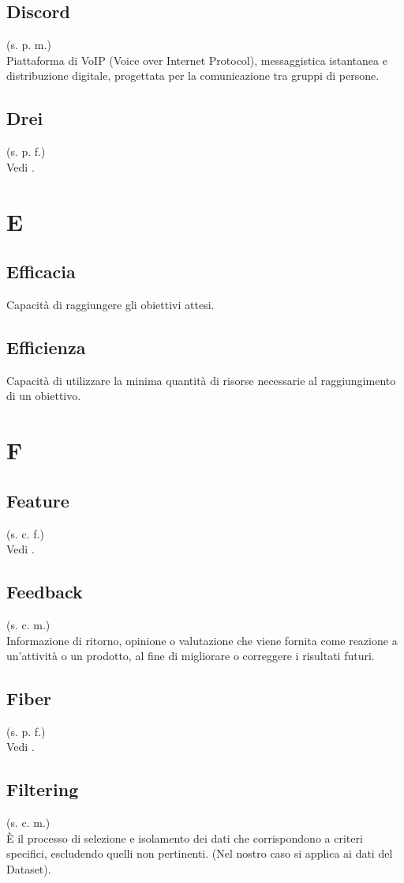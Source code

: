     \subsection{Discord}
    (s. p. m.)\\
    Piattaforma di VoIP (Voice over Internet Protocol), messaggistica istantanea 
    e distribuzione digitale, progettata per la comunicazione tra gruppi di persone.
    \subsection{Drei}
    (s. p. f.)\\
    Vedi .
\pagebreak
\section{E}
    \subsection{Efficacia}
    Capacità di raggiungere gli obiettivi attesi.
    \subsection{Efficienza}
    Capacità di utilizzare la minima quantità di risorse necessarie al raggiungimento
    di un obiettivo.
\pagebreak
\section{F}
    \subsection{Feature}
    (s. c. f.)\\
    Vedi .
    \subsection{Feedback}
    (s. c. m.)\\
    Informazione di ritorno, opinione o valutazione che viene fornita come reazione a 
    un'attività o un prodotto, al fine di migliorare o correggere i risultati futuri.
    \subsection{Fiber}
    (s. p. f.)\\
    Vedi .
    \subsection{Filtering}
    (s. c. m.)\\
    È il processo di selezione e isolamento dei dati che corrispondono a criteri specifici, escludendo quelli non pertinenti. (Nel nostro caso si applica ai dati del Dataset).
